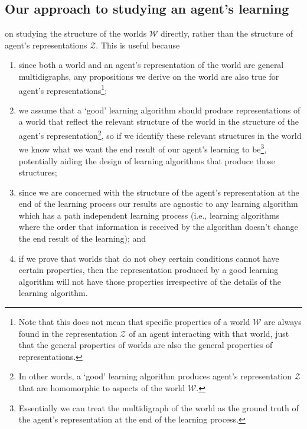 
\subsection{Our approach to studying an agent's learning}

 on studying the structure of the worlds $\mathscr{W}$ directly, rather than the structure of agent's representations $\mathscr{Z}$.
This is useful because
\begin{enumerate}
    \item since both a world and an agent's representation of the world are general multidigraphs, any propositions we derive on the world are also true for agent's representations\footnote{
    Note that this does not mean that specific properties of a world $\mathscr{W}$ are always found in the representation $\mathscr{Z}$ of an agent interacting with that world, just that the general properties of worlds are also the general properties of representations.
    };
    
    \item we assume that a `good' learning algorithm should produce representations of a world that reflect the relevant structure of the world in the structure of the agent's representation\footnote{
    In other words, a `good' learning algorithm produces agent's representation $\mathscr{Z}$ that are homomorphic to aspects of the world $\mathscr{W}$.
    }, so if we identify these relevant structures in the world we know what we want the end result of our agent's learning to be\footnote{
    Essentially we can treat the multidigraph of the world as the ground truth of the agent's representation at the end of the learning process.
    }, potentially aiding the design of learning algorithms that produce those structures;

    \item since we are concerned with the structure of the agent's representation at the end of the learning process our results are agnostic to any learning algorithm which has a path independent learning process (i.e., learning algorithms where the order that information is received by the algorithm doesn't change the end result of the learning); and

    \item if we prove that worlds that do not obey certain conditions cannot have certain properties, then the representation produced by a good learning algorithm will not have those properties irrespective of the details of the learning algorithm.
\end{enumerate}


